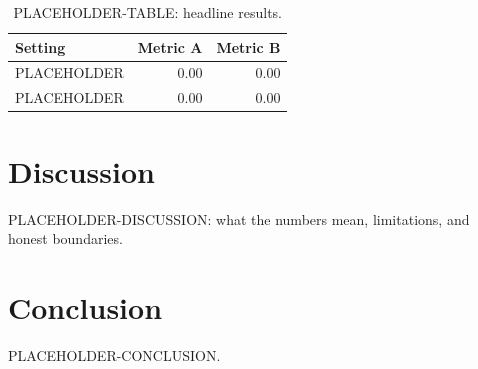 \documentclass[11pt]{article}
\begin{document}
\begin{table}[t]
\centering
\caption{PLACEHOLDER-TABLE: headline results.}
\label{tab:placeholder}
\begin{tabular}{lrr}
\toprule
Setting & Metric A & Metric B \\
\midrule
PLACEHOLDER & 0.00 & 0.00 \\
PLACEHOLDER & 0.00 & 0.00 \\
\bottomrule
\end{tabular}
\end{table}

\section{Discussion}
PLACEHOLDER-DISCUSSION: what the numbers mean, limitations, and honest boundaries.

\section{Conclusion}
PLACEHOLDER-CONCLUSION.



\end{document}
